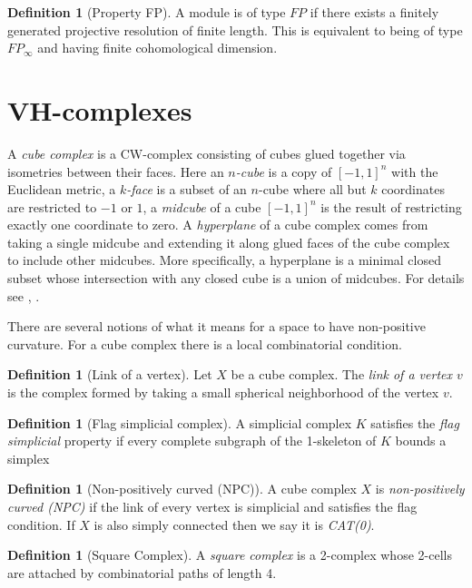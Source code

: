 \documentclass[12pt,parskip=full]{report}
\theoremstyle{plain}
\theoremstyle{definition}
\newtheorem{dfn}[thm]{Definition}
\begin{document}
\begin{dfn}
[Property FP]
A module is of type \(FP\) if there exists a finitely generated projective resolution of finite length. This is equivalent to being of type \(FP_\infty\) and having finite cohomological dimension.
\end{dfn}

\section{VH-complexes}

A \emph{cube complex} is a CW-complex consisting of cubes glued together via isometries between their faces. Here an \emph{\(n\)-cube} is a copy of \([-1,1]^n\) with the Euclidean metric, a \emph{\(k\)-face} is a subset of an \(n\)-cube where all but \(k\) coordinates are restricted to \(-1\) or \(1\), a \emph{midcube} of a cube \([-1,1]^n\) is the result of restricting exactly one coordinate to zero. A \emph{hyperplane} of a cube complex comes from taking a single midcube and extending it along glued faces of the cube complex to include other midcubes. More specifically, a hyperplane is a minimal closed subset whose intersection with any closed cube is a union of midcubes. For details see \cite{manning}, \cite{haglundwise}.

There are several notions of what it means for a space to have non-positive curvature. For a cube complex there is a local combinatorial condition.

\begin{dfn}
    [Link of a vertex]
    Let \(X\) be a cube complex. The \emph{link of a vertex \(v\)} is the complex formed by taking a small spherical neighborhood of the vertex \(v\).
\end{dfn}

\begin{dfn}
    [Flag simplicial complex]
    A simplicial complex \(K\) satisfies the \emph{flag simplicial} property if every complete subgraph of the 1-skeleton of \(K\) bounds a simplex 
\end{dfn}

\begin{dfn}
    [Non-positively curved (NPC)]
    A cube complex \(X\) is \emph{non-positively curved (NPC)} if the link of every vertex is simplicial and satisfies the flag condition. If \(X\) is also simply connected then we say it is \emph{CAT(0)}.
\end{dfn}


\begin{dfn}
    [Square Complex]
    A \emph{square complex} is a 2-complex whose 2-cells are attached by combinatorial paths of length 4.
\end{dfn}
\end{document}
